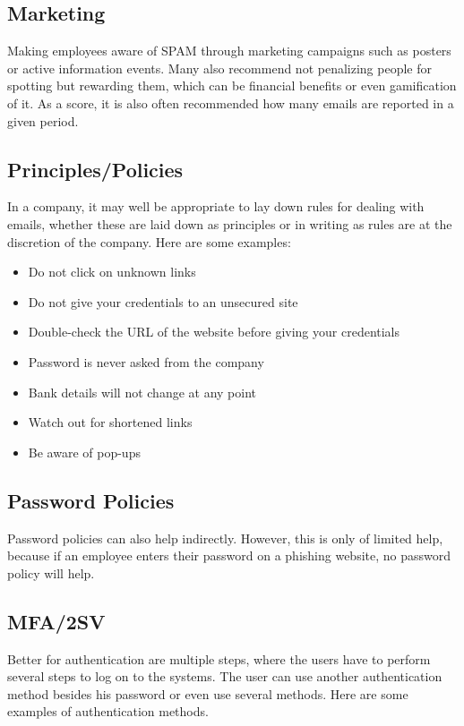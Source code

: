 \subsection{Marketing}
Making employees aware of SPAM through marketing campaigns such as posters or active information events.
Many also recommend not penalizing people for spotting but rewarding them, which can be financial benefits or even gamification of it.
As a score, it is also often recommended how many emails are reported in a given period.

\subsection{Principles/Policies}
In a company, it may well be appropriate to lay down rules for dealing with emails, whether these are laid down as principles or in writing as rules are at the discretion of the company.
Here are some examples:

\begin{itemize}
    \item Do not click on unknown links
    \item Do not give your credentials to an unsecured site
    \item Double-check the URL of the website before giving your credentials
    \item Password is never asked from the company
    \item Bank details will not change at any point
    \item Watch out for shortened links
    \item Be aware of pop-ups
\end{itemize}


\subsection{Password Policies}
Password policies can also help indirectly.
However, this is only of limited help, because if an employee enters their password on a phishing website, no password policy will help.
\subsection{MFA/2SV}
Better for authentication are multiple steps, where the users have to perform several steps to log on to the systems. The user can use another authentication method besides his password or even use several methods.
Here are some examples of authentication methods.

